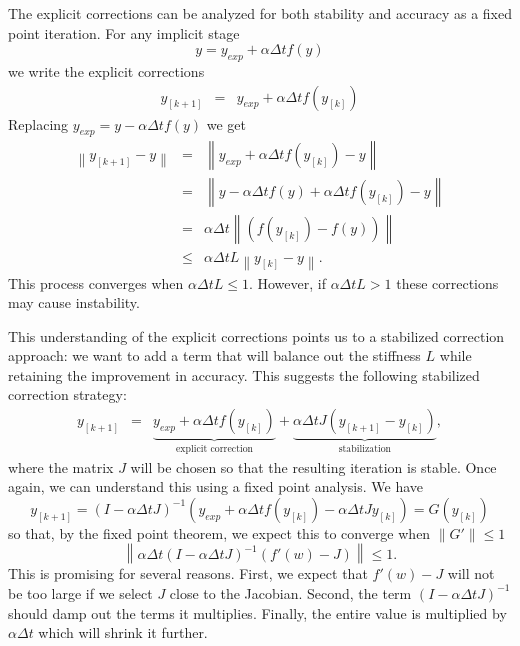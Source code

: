 \documentclass{siamart251104}
\newcommand{\dt}{\Delta t}
\begin{document}
The explicit corrections can be analyzed for both stability and accuracy as a fixed point iteration. For any implicit stage
\[ y = y_{exp} + \alpha \dt f(y)\]
we write the  explicit corrections
\begin{eqnarray*}
  y_{[k+1]} & = & y_{exp}  + \alpha \dt f(y_{[k]}) 
\end{eqnarray*}
Replacing $y_{exp} = y - \alpha \dt f(y)$ we get
\begin{eqnarray*}
\left\| y_{[k+1]} -  y \right\|
& = & \left\| y_{exp}  + \alpha \dt f(y_{[k]}) - y \right\|\\
& = &  \left\|y - \alpha \dt f(y) + \alpha \dt f(y_{[k]}) - y\right\| \\
& = & \alpha \dt \left\| \left( f(y_{[k]}) - f(y) \right)\right\| \\
& \leq & \alpha \dt  L  \left\|y_{[k]}  - y \right\|.
\end{eqnarray*}
This process converges when $\alpha \dt L \leq 1$. 
However, if $\alpha \dt L > 1$ these corrections
may  cause instability.


This understanding of the explicit corrections points 
us to a stabilized correction approach: 
we want to add a term that will balance out the stiffness $L$ while retaining the improvement in accuracy. 
This suggests the following stabilized correction strategy:
\begin{eqnarray} \label{CorrStab1}
y_{[k+1]} & = &
\underbrace{y_{exp} 
+ \alpha \dt f(y_{[k]})}_{\mbox{explicit correction}}
+ \underbrace{\alpha \dt J  \left(y_{[k+1]} - y_{[k]} \right)}_{\mbox{stabilization}} ,
\end{eqnarray}
where the matrix $J$ will be chosen
so that the resulting iteration is stable.
Once again, we can understand this using a  fixed point analysis. We have 
\[ y_{[k+1]}  = \left( I - \alpha \dt J \right)^{-1} 
 \left( y_{exp}  + \alpha \dt f(y_{[k]}) -   \alpha \dt J y_{[k]} \right) = G(y_{[k]}) \]
so that, by the fixed point theorem,  we expect this to converge when $\| G'\| \leq 1$
\[  \left\| \alpha \dt \left( I - \alpha \dt J \right)^{-1}  \left( f'(w) - J  \right) \right\| \leq 1.\]
This is promising for several reasons. 
First, we expect that $f'(w) - J $ will not be too large if we select $J$
    close to the Jacobian. Second, the term $\left( I - \alpha \dt J \right)^{-1}$ should damp out the terms it multiplies. Finally, the entire value is multiplied by $\alpha \dt$ which will shrink it
    further.
\end{document}
